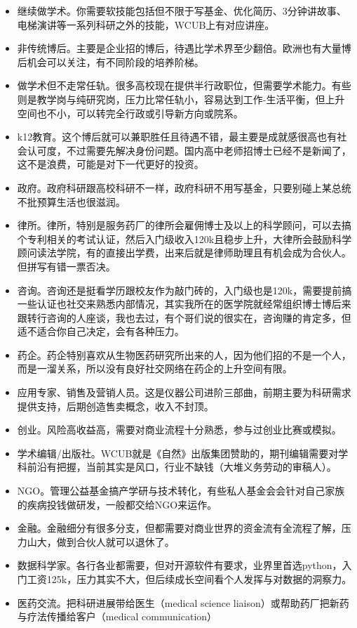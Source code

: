 \documentclass[
]{book}
\begin{document}
\begin{itemize}
\item
  继续做学术。你需要软技能包括但不限于写基金、优化简历、3分钟讲故事、电梯演讲等一系列科研之外的技能，WCUB上有对应讲座。
\item
  非传统博后。主要是企业招的博后，待遇比学术界至少翻倍。欧洲也有大量博后机会可以关注，有不同阶段的培养阶梯。
\item
  做学术但不走常任轨。很多高校现在提供半行政职位，但需要学术能力。有些则是教学岗与纯研究岗，压力比常任轨小，容易达到工作-生活平衡，但上升空间也不小，可以转完全行政或引导新方向或院系。
\item
  k12教育。这个博后就可以兼职胜任且待遇不错，最主要是成就感很高也有社会认可度，不过需要先解决身份问题。国内高中老师招博士已经不是新闻了，这不是浪费，可能是对下一代更好的投资。
\item
  政府。政府科研跟高校科研不一样，政府科研不用写基金，只要别碰上某总统不批预算生活也很滋润。
\item
  律所。律所，特别是服务药厂的律所会雇佣博士及以上的科学顾问，可以去搞个专利相关的考试认证，然后入门级收入120k且稳步上升，大律所会鼓励科学顾问读法学院，有的直接出学费，出来后就是律师助理且有机会成为合伙人。但拼写有错一票否决。
\item
  咨询。咨询还是挺看学历跟校友作为敲门砖的，入门级也是120k，需要提前搞一些认证也社交来熟悉内部情况，其实我所在的医学院就经常组织博士博后来跟转行咨询的人座谈，我也去过，有个哥们说的很实在，咨询赚的肯定多，但适不适合你自己决定，会有各种压力。
\item
  药企。药企特别喜欢从生物医药研究所出来的人，因为他们招的不是一个人，而是一溜关系，所以没有良好社交网络在药企的上升空间有限。
\item
  应用专家、销售及营销人员。这是仪器公司进阶三部曲，前期主要为科研需求提供支持，后期创造售卖概念，收入不封顶。
\item
  创业。风险高收益高，需要对商业流程十分熟悉，参与过创业比赛或模拟。
\item
  学术编辑/出版社。WCUB就是《自然》出版集团赞助的，期刊编辑需要对学科前沿有把握，当前其实是风口，行业不缺钱（大堆义务劳动的审稿人）。
\item
  NGO。管理公益基金搞产学研与技术转化，有些私人基金会会针对自己家族的疾病投钱做研发，一般都交给NGO来运作。
\item
  金融。金融细分有很多分支，但都需要对商业世界的资金流有全流程了解，压力山大，做到合伙人就可以退休了。
\item
  数据科学家。各行各业都需要，但对开源软件有要求，业界里首选python，入门工资125k，压力其实不大，但后续成长空间看个人发挥与对数据的洞察力。
\item
  医药交流。把科研进展带给医生（medical science liaison）或帮助药厂把新药与疗法传播给客户（medical communication）
\end{itemize}
\end{document}
